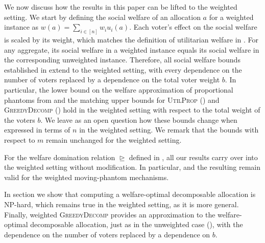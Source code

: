 \documentclass[11pt]{article}
\newcommand{\UtP}{\textsc{UtilProp} }
\newcommand{\GrdDec}{\textsc{GreedyDecomp} }
\begin{document}
We now discuss how the results in this paper can be lifted to the weighted setting. 
We start by defining the social welfare of an allocation $a$ for a weighted instance as $w(a) = \sum_{i \in [n]} w_i u_i(a)$. Each voter's effect on the social welfare is scaled by its weight, which matches the definition of utilitarian welfare in \citet{brandt2023balanced}. For any aggregate, its social welfare in a weighted instance equals its social welfare in the corresponding unweighted instance. Therefore, all social welfare bounds established in  extend to the weighted setting, with every dependence on the number of voters replaced by a dependence on the total voter weight $b$. In particular, the lower bound on the welfare approximation of proportional phantoms from  and the matching upper bounds for \UtP () and \GrdDec () hold in the weighted setting with respect to the total weight of the voters $b$. We leave as an open question how these bounds change when expressed in terms of $n$ in the weighted setting.
We remark that the bounds with respect to $m$ remain unchanged for the weighted setting.

For the welfare domination relation $\trianglerighteq$ defined in , all our results carry over into the weighted setting without modification. In particular,  and the resulting  remain valid for the weighted moving-phantom mechanisms.

In section  we show that computing a welfare-optimal decomposable allocation is NP-hard, which remains true in the weighted setting, as it is more general. Finally, weighted \GrdDec provides an approximation to the welfare-optimal decomposable allocation, just as in the unweighted case (), with the dependence on the number of voters replaced by a dependence on $b$.
\end{document}
